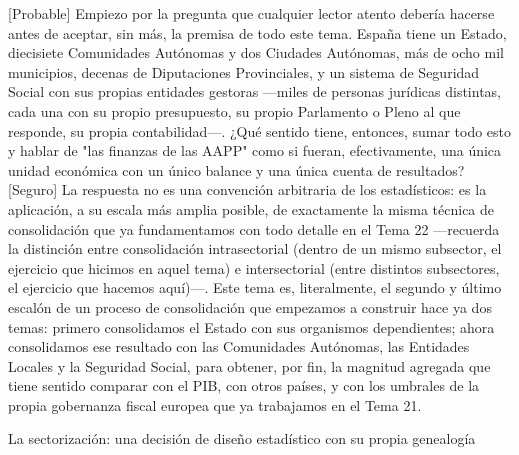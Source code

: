 \documentclass[10pt,a4paper]{article}
\begin{document}
[Probable] Empiezo por la pregunta que cualquier lector atento debería hacerse antes de aceptar, sin más, la premisa de todo este tema. España tiene un Estado, diecisiete Comunidades Autónomas y dos Ciudades Autónomas, más de ocho mil municipios, decenas de Diputaciones Provinciales, y un sistema de Seguridad Social con sus propias entidades gestoras —miles de personas jurídicas distintas, cada una con su propio presupuesto, su propio Parlamento o Pleno al que responde, su propia contabilidad—. ¿Qué sentido tiene, entonces, sumar todo esto y hablar de "las finanzas de las AAPP" como si fueran, efectivamente, una única unidad económica con un único balance y una única cuenta de resultados? [Seguro] La respuesta no es una convención arbitraria de los estadísticos: es la aplicación, a su escala más amplia posible, de exactamente la misma técnica de consolidación que ya fundamentamos con todo detalle en el Tema 22 —recuerda la distinción entre consolidación intrasectorial (dentro de un mismo subsector, el ejercicio que hicimos en aquel tema) e intersectorial (entre distintos subsectores, el ejercicio que hacemos aquí)—. Este tema es, literalmente, el segundo y último escalón de un proceso de consolidación que empezamos a construir hace ya dos temas: primero consolidamos el Estado con sus organismos dependientes; ahora consolidamos ese resultado con las Comunidades Autónomas, las Entidades Locales y la Seguridad Social, para obtener, por fin, la magnitud agregada que tiene sentido comparar con el PIB, con otros países, y con los umbrales de la propia gobernanza fiscal europea que ya trabajamos en el Tema 21.

La sectorización: una decisión de diseño estadístico con su propia genealogía
\end{document}
